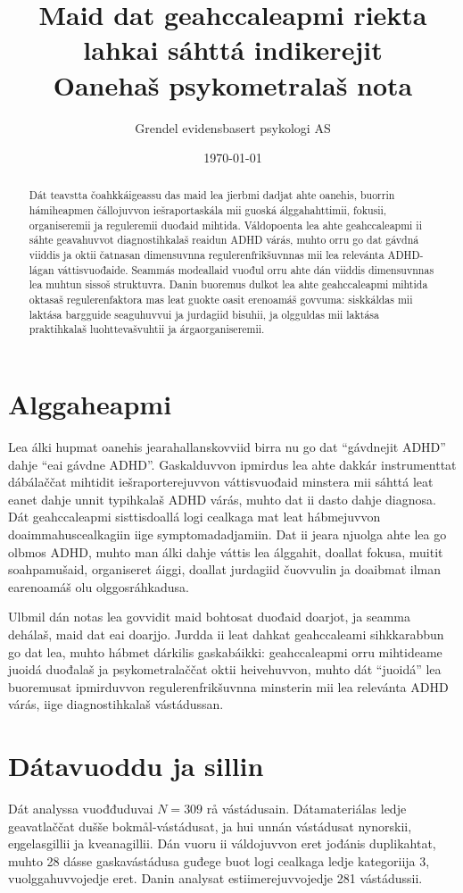 \documentclass[11pt,a4paper]{article}
\title{Maid dat geahccaleapmi riekta lahkai sáhttá indikerejit\\
\large Oanehaš psykometralaš nota}
\author{Grendel evidensbasert psykologi AS}
\date{\today}
\begin{document}
\maketitle

\begin{abstract}
Dát teavstta čoahkkáigeassu das maid lea jierbmi dadjat ahte oanehis, buorrin hámiheapmen čállojuvvon iešraportaskála mii guoská álggahahttimii, fokusii, organiseremii ja reguleremii duođaid mihtida. Váldopoenta lea ahte geahccaleapmi ii sáhte geavahuvvot diagnostihkalaš reaidun ADHD várás, muhto orru go dat gávdná viiddis ja oktii čatnasan dimensuvnna regulerenfrikšuvnnas mii lea relevánta ADHD-lágan váttisvuođaide. Seammás modeallaid vuođul orru ahte dán viiddis dimensuvnnas lea muhtun sissoš struktuvra. Danin buoremus dulkot lea ahte geahccaleapmi mihtida oktasaš regulerenfaktora mas leat guokte oasit erenoamáš govvuma: siskkáldas mii laktása bargguide seaguhuvvui ja jurdagiid bisuhii, ja olgguldas mii laktása praktihkalaš luohttevašvuhtii ja árgaorganiseremii.
\end{abstract}

\section{Alggaheapmi}
Lea álki hupmat oanehis jearahallanskovviid birra nu go dat ``gávdnejit ADHD'' dahje ``eai gávdne ADHD''. Gaskalduvvon ipmirdus lea ahte dakkár instrumenttat dábálaččat mihtidit iešraporterejuvvon váttisvuođaid minstera mii sáhttá leat eanet dahje unnit typihkalaš ADHD várás, muhto dat ii dasto dahje diagnosa. Dát geahccaleapmi sisttisdoallá logi cealkaga mat leat hábmejuvvon doaimmahuscealkagiin iige symptomadadjamiin. Dat ii jeara njuolga ahte lea go olbmos ADHD, muhto man álki dahje váttis lea álggahit, doallat fokusa, muitit soahpamušaid, organiseret áiggi, doallat jurdagiid čuovvulin ja doaibmat ilman earenoamáš olu olggosráhkadusa.

Ulbmil dán notas lea govvidit maid bohtosat duođaid doarjot, ja seamma dehálaš, maid dat eai doarjjo. Jurdda ii leat dahkat geahccaleami sihkkarabbun go dat lea, muhto hábmet dárkilis gaskabáikki: geahccaleapmi orru mihtideame juoidá duođalaš ja psykometralaččat oktii heivehuvvon, muhto dát ``juoidá'' lea buoremusat ipmirduvvon regulerenfrikšuvnna minsterin mii lea relevánta ADHD várás, iige diagnostihkalaš vástádussan.

\section{Dátavuoddu ja sillin}
Dát analyssa vuođđuduvai $N = 309$ rå vástádusain. Dátamateriálas ledje geavatlaččat dušše bokmål-vástádusat, ja hui unnán vástádusat nynorskii, eŋgelasgillii ja kveanagillii. Dán vuoru ii váldojuvvon eret jođánis duplikahtat, muhto 28 dásse gaskavástádusa guđege buot logi cealkaga ledje kategoriija 3, vuolggahuvvojedje eret. Danin analysat estiimerejuvvojedje 281 vástádussii.
\end{document}
